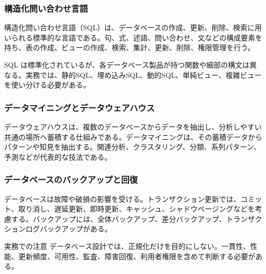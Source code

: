 \subsubsection{構造化問い合わせ言語}

構造化問い合わせ言語（SQL）は、データベースの作成、更新、削除、検索に用いられる標準的な言語である。句、式、述語、問い合わせ、文などの構成要素を持ち、表の作成、ビューの作成、検索、集計、更新、削除、権限管理を行う。

SQL は標準化されているが、各データベース製品が持つ関数や細部の構文は異なる。実務では、静的SQL、埋め込みSQL、動的SQL、単純ビュー、複雑ビューを使い分ける必要がある。

\subsubsection{データマイニングとデータウェアハウス}

データウェアハウスは、複数のデータベースからデータを抽出し、分析しやすい共通の場所へ蓄積する仕組みである。データマイニングは、その蓄積データからパターンや知見を抽出する。関連分析、クラスタリング、分類、系列パターン、予測などが代表的な技法である。

\subsubsection{データベースのバックアップと回復}

データベースは故障や破損の影響を受ける。トランザクション更新では、コミット、取り消し、遅延更新、即時更新、キャッシュ、シャドウページングなどを考慮する。バックアップには、全体バックアップ、差分バックアップ、トランザクションログバックアップがある。

\begin{pointbox}{実務での注意}
データベース設計では、正規化だけを目的にしない。一貫性、性能、更新頻度、可用性、監査、障害回復、利用者権限を含めて判断する必要がある。

\end{pointbox}
